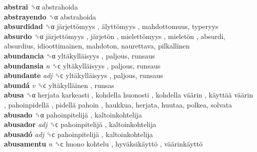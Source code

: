 \textbf{abstrai} ␝α  abstrahoida  \\
\textbf{abstrayendo} ␝α  abstrahoida  \\
\textbf{absurdidad} ␝α   järjettömyys ,  älyttömyys , mahdottomuus, typeryys  \\
\textbf{absurdo} ␝α   järjettömyys ,  järjetön ,  mielettömyys ,  mieletön , absurdi, absurdius, idioottimainen, mahdoton, naurettava, pilkallinen  \\
\textbf{abundancia} ␝α   yltäkylläisyys , paljous, runsaus  \\
\textbf{abundansia} \emph{n}  ␝ϲ   yltäkylläisyys , paljous, runsaus  \\
\textbf{abundante} \emph{adj}  ␝ϲ   yltäkylläisyys , paljous, runsaus  \\
\textbf{abundá} \emph{v}  ␝ϲ   yltäkylläinen , runsas  \\
\textbf{abusa} ␝α   herjata karkeasti ,  kohdella huonosti ,  kohdella väärin ,  käyttää väärin ,  pahoinpidellä ,  pidellä pahoin , haukkua, herjata, huutaa, polkea, solvata  \\
\textbf{abusado} ␝α   pahoinpitelijä , kaltoinkohtelija  \\
\textbf{abusador} \emph{adj}  ␝ϲ   pahoinpitelijä , kaltoinkohtelija  \\
\textbf{abusadó} \emph{adj}  ␝ϲ   pahoinpitelijä , kaltoinkohtelija  \\
\textbf{abusamentu} \emph{n}  ␝ϲ   huono kohtelu ,  hyväksikäyttö ,  väärinkäyttö   \\
